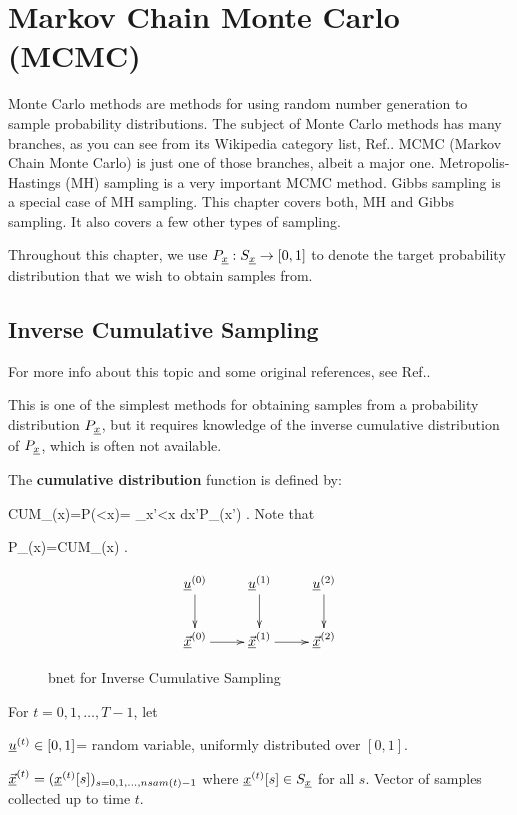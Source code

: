 \chapter{Markov Chain Monte Carlo (MCMC)}


Monte Carlo methods
are methods for using
 random number generation to
sample probability distributions.
The subject of Monte Carlo methods
has many branches, as you can see 
from its Wikipedia
category list, Ref.\cite{wiki-monte-carlo}.
MCMC (Markov
Chain Monte Carlo) is just one of those
branches, albeit a major one.
Metropolis-Hastings (MH) sampling
is a very important MCMC method.
Gibbs sampling is
a special case
of MH sampling.
This chapter covers both, MH and Gibbs sampling.
It also covers a few 
other types of sampling.

Throughout this chapter,
we use $P_{\underline{x}}:S_{\underline{x}}\rightarrow [0,1]$
to denote the target probability
distribution
that we wish to obtain samples from.


\section*{Inverse Cumulative Sampling}
For more info about this topic 
and some original references, 
see Ref.\cite{wiki-inv-cum}.

This
is one of the simplest
methods for obtaining
samples from a probability 
distribution $P_{\underline{x}}$,
but it
requires knowledge
of the inverse
 cumulative distribution
of $P_{\underline{x}}$, which
is often not available.

The {\bf cumulative
distribution} function
is defined by:

\beq
CUM_\rvx(x)=P(\rvx<x)=
\int_{x'<x} dx'\;P_\rvx(x')
\;.
\eeq
Note that

\beq
P_\rvx(x)=CUM_\rvx(x)
\;.
\eeq


\begin{figure}[h!]
$$\xymatrix{
\rvu^{(0)}\ar[d]
&\rvu^{(1)}\ar[d]
&\rvu^{(2)}\ar[d]
\\
\ul{\vecx}^{(0)}\ar[r]
&\ul{\vecx}^{(1)}\ar[r]
&\ul{\vecx}^{(2)}
}$$
\caption{bnet for Inverse Cumulative Sampling}
\label{fig-mcmc-inverse-bnet}
\end{figure}

For $t=0, 1, \ldots, T-1$, let

${\underline{u}}^{(t)}\in [0,1]$= random variable, 
uniformly
distributed over $[0,1]$.

$\underline{{\vec{x}}}^{(t)}=({\underline{x}}^{(t)}[s])_{s=0,1, 
\ldots, nsam(t)-1}$
where ${\underline{x}}^{(t)}[s] \in S_{\underline{x}}$ for all $s$. 
Vector of samples collected 
up to time $t$.

